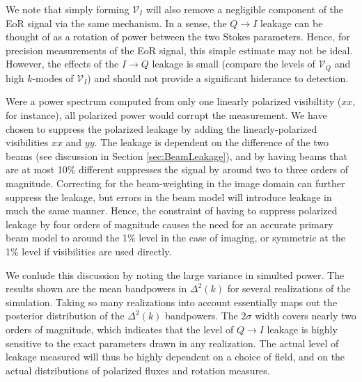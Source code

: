 We note that simply forming $\mathcal{V}_I$ will also remove a negligible component of the EoR
signal via the same mechanism. In a sense, the $Q\to I$ leakage can be thought of as a rotation of
power between the two Stokes parameters. Hence, for precision measurements of the EoR signal, this
simple estimate may not be ideal. However, the effects of the $I\to Q$ leakage is small (compare the
levels of $\mathcal{V}_Q$ and high $k$-modes of $\mathcal{V}_I$) and should not provide a
significant hiderance to detection.

Were a power spectrum computed from only one linearly polarized visibiltity ($xx$, for instance),
all polarized power would corrupt the measurement. We have chosen to suppress the polarized leakage
by adding the linearly-polarized visibilities $xx$ and $yy$. The leakage is dependent on the
difference of the two beams (see discussion in Section \ref{sec:BeamLeakage}), and by having beams
that are at most 10\% different suppresses the signal by around two to three orders of magnitude.
Correcting for the beam-weighting in the image domain can further suppress the leakage, but errors
in the beam model will introduce leakage in much the same manner. Hence, the constraint of having to
suppress polarized leakage by four orders of magnitude causes the need for an accurate primary beam
model to around the 1\% level in the case of imaging, or symmetric at the 1\% level if visibilities
are used directly.

We conlude this discussion by noting the large variance in simulted power. The results shown are the
mean bandpowers  in $\Delta^2(k)$ for several realizations of the simulation. Taking so many
realizations into account essentially maps out the posterior distribution of the $\Delta^2(k)$
bandpowers. The $2\sigma$ width covers nearly two orders of magnitude, which indicates that the
level of $Q\to I$ leakage is highly sensitive to the exact parameters drawn in any realization.
The actual level of leakage measured will thus be highly dependent on a choice of field, and on
the actual distributions of polarized fluxes and rotation measures.

